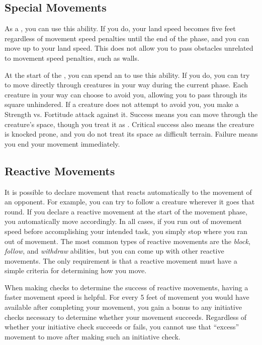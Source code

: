     \subsection{Special Movements}

         As a , you can use this ability.
        If you do, your land speed becomes five feet regardless of movement speed penalties until the end of the phase, and you can move up to your land speed.
        This does not allow you to pass obstacles unrelated to movement speed penalties, such as walls.

        \label{Overrun} At the start of the , you can spend an  to use this ability.
        If you do, you can try to move directly through creatures in your way during the current phase.
        Each creature in your way can choose to avoid you, allowing you to pass through its square unhindered.
        If a creature does not attempt to avoid you, you make a Strength vs. Fortitude attack against it.
        Success means you can move through the creature's space, though you treat it as .
        Critical success also means the creature is knocked prone, and you do not treat its space as difficult terrain.
        Failure means you end your movement immediately.

    \subsection{Reactive Movements}

        It is possible to declare movement that reacts automatically to the movement of an opponent.
        For example, you can try to follow a creature wherever it goes that round.
        If you declare a reactive movement at the start of the movement phase, you automatically move accordingly.
        In all cases, if you run out of movement speed before accomplishing your intended task, you simply stop where you ran out of movement.
        The most common types of reactive movements are the \textit{block}, \textit{follow}, and \textit{withdraw} abilities, but you can come up with other reactive movements.
        The only requirement is that a reactive movement must have a simple criteria for determining how you move.

        \label{Movement-Based Initiative} When making  checks to determine the success of reactive movements, having a faster movement speed is helpful.
        For every 5 feet of movement you would have available after completing your movement, you gain a  bonus to any initiative checks necessary to determine whether your movement succeeds.
        Regardless of whether your initiative check succeeds or fails, you cannot use that ``excess'' movement to move after making such an initiative check.

